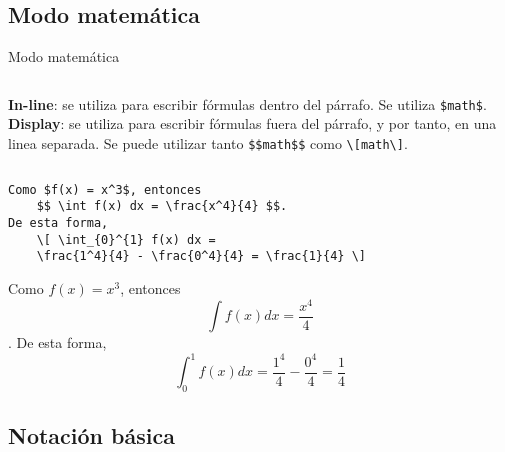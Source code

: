 \documentclass[../slides.tex]{subfiles}
\begin{document}
    \begin{frame}
        \tableofcontents[sections=\value{section}]
    \end{frame}

    \subsection{Modo matemática}

    \begin{frame}[fragile]{Modo matemática}
        \begin{columns}[t]
                \textbf{In-line}: se utiliza para escribir fórmulas dentro del párrafo. Se utiliza \texttt{\$math\$}.
                \textbf{Display}: se utiliza para escribir fórmulas fuera del párrafo, y por tanto, en una linea separada. Se puede utilizar tanto \texttt{\$\$math\$\$} como \texttt{\textbackslash[math\textbackslash]}.
        \end{columns}
        \begin{verbatim}
Como $f(x) = x^3$, entonces
    $$ \int f(x) dx = \frac{x^4}{4} $$.
De esta forma,
    \[ \int_{0}^{1} f(x) dx = 
    \frac{1^4}{4} - \frac{0^4}{4} = \frac{1}{4} \]
        \end{verbatim}
Como $f(x) = x^3$, entonces
    $$ \int f(x) dx = \frac{x^4}{4} $$.
De esta forma,
    \[ \int_{0}^{1} f(x) dx = 
    \frac{1^4}{4} - \frac{0^4}{4} = \frac{1}{4} \]
    \end{frame}

    \subsection{Notación básica}
    
\end{document}
